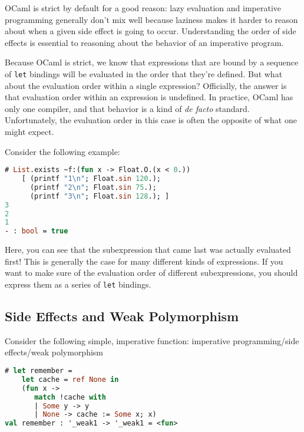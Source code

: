 OCaml is strict by default for a good reason: lazy evaluation and
imperative programming generally don't mix well because laziness makes
it harder to reason about when a given side effect is going to occur.
Understanding the order of side effects is essential to reasoning about
the behavior of an imperative program.

Because OCaml is strict, we know that expressions that are bound by a
sequence of \passthrough{\lstinline!let!} bindings will be evaluated in
the order that they're defined. But what about the evaluation order
within a single expression? Officially, the answer is that evaluation
order within an expression is undefined. In practice, OCaml has only one
compiler, and that behavior is a kind of \emph{de facto} standard.
Unfortunately, the evaluation order in this case is often the opposite
of what one might expect.

Consider the following example:

\begin{lstlisting}[language=Caml]
# List.exists ~f:(fun x -> Float.O.(x < 0.))
    [ (printf "1\n"; Float.sin 120.);
      (printf "2\n"; Float.sin 75.);
      (printf "3\n"; Float.sin 128.); ]
3
2
1
- : bool = true
\end{lstlisting}

Here, you can see that the subexpression that came last was actually
evaluated first! This is generally the case for many different kinds of
expressions. If you want to make sure of the evaluation order of
different subexpressions, you should express them as a series of
\passthrough{\lstinline!let!} bindings.

\hypertarget{side-effects-and-weak-polymorphism}{%
\subsection{Side Effects and Weak
Polymorphism}\label{side-effects-and-weak-polymorphism}}

Consider the following simple, imperative function:
\protect\hypertarget{IPsideweak}{}{imperative
programming/side effects/weak polymorphism}

\begin{lstlisting}[language=Caml]
# let remember =
    let cache = ref None in
    (fun x ->
       match !cache with
       | Some y -> y
       | None -> cache := Some x; x)
val remember : '_weak1 -> '_weak1 = <fun>
\end{lstlisting}

